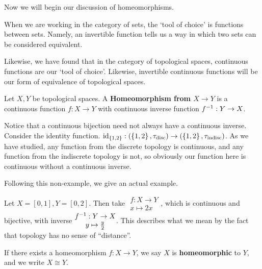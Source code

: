 \documentclass[12pt, twosided]{article}
\begin{document}
Now we will begin our discussion of homeomorphisms.

When we are working in the category of sets, the `tool of choice' is functions between sets. Namely, an invertible function tells us a way in which two sets can be considered equivalent.

Likewise, we have found that in the category of topological spaces, continuous functions are our `tool of choice'. Likewise, invertible continuous functions will be our form of equivalence of topological spaces.

\begin{df}
  Let \(X, Y\) be topological spaces. A \textbf{Homeomorphism from \(X \to Y\)} is a continuous function \(f: X \to Y\) with continuous inverse function \(f^{-1}:Y \to X\).
\end{df}

\begin{exa}
  Notice that a continuous bijection need not always have a continuous inverse. Consider the identity function. \(\mathrm{id}_{\{1, 2\}}:(\left\{ 1, 2 \right\}, \tau_{\mathrm{disc}}) \to (\left\{ 1, 2 \right\}, \tau_{\mathrm{indisc}})\). As we have studied, any function from the discrete topology is continuous, and any function from the indiscrete topology is not, so obviously our function here is continuous without a continuous inverse.
\end{exa}

Following this non-example, we give an actual example.

\begin{exa}
  Let \(X = [0, 1], Y = [0, 2]\). Then take \(
  \begin{matrix}
    f: X \to Y \\ x \mapsto 2x 
  \end{matrix} \), which is continuous and bijective, with inverse \(
  \begin{matrix}
    f^{-1}: Y \to X \\ y \mapsto \frac{y}{2}
  \end{matrix}\). This describes what we mean by the fact that topology has no sense of ``distance''.
\end{exa}

\begin{df}
  If there exists a homeomorphism \(f: X \to Y\), we say \(X\) is \textbf{homeomorphic} to \(Y\), and we write \(X \cong Y\).
\end{df}
\end{document}
